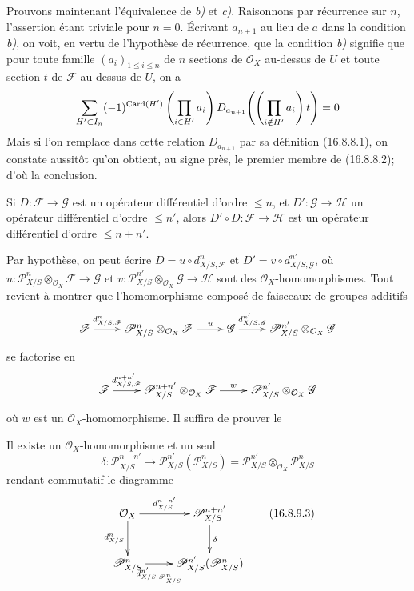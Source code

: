 Prouvons maintenant l'équivalence de \emph{b)} et \emph{c)}. Raisonnons par récurrence sur
$n$, l'assertion étant triviale pour $n=0$. Écrivant $a_{n+1}$ au lieu de $a$
dans la condition \emph{b)}, on voit, en vertu de l'hypothèse de récurrence, que la
condition \emph{b)} signifie que pour toute famille $(a_i)_{1\leq i\leq n}$ de $n$
sections de $\mathcal{O}_X$ au-dessus de $U$ et toute section $t$ de
$\mathscr{F}$ au-dessus de $U$, on a
\[
  \sum_{H'\subset I_n}(- 1)^{\operatorname{Card}(H')}
  \left(\prod_{i\in H'}a_i\right)
  D_{a_{n+1}}\!\left(\left(\prod_{i\notin H'}a_i\right)t\right)=0
\]
Mais si l'on remplace dans cette relation $D_{a_{n+1}}$ par sa définition
(16.8.8.1), on constate aussitôt qu'on obtient, au signe près, le premier
membre de (16.8.8.2); d'où la conclusion.

\begin{proposition}[16.8.9]
\label{IV.16.8.9}
Si $D:\mathscr{F}\to\mathscr{G}$ est un opérateur différentiel d'ordre
$\leq n$, et $D':\mathscr{G}\to\mathscr{H}$ un opérateur différentiel d'ordre
$\leq n'$, alors $D'\circ D:\mathscr{F}\to\mathscr{H}$ est un opérateur
différentiel d'ordre $\leq n+n'$.
\end{proposition}

Par hypothèse, on peut écrire $D=u\circ d_{X/S,\mathscr{F}}^n$ et
$D'=v\circ d_{X/S,\mathscr{G}}^{n'}$, où
$u:\mathscr{P}_{X/S}^n\otimes_{\mathcal{O}_X}\mathscr{F}\to\mathscr{G}$ et
$v:\mathscr{P}_{X/S}^{n'}\otimes_{\mathcal{O}_X}\mathscr{G}\to\mathscr{H}$
sont des $\mathcal{O}_X$-homomorphismes. Tout revient à montrer que
l'homomorphisme composé de faisceaux de groupes additifs
\[
  \xymatrix{
    \mathscr{F}\ar[r]^-{d_{X/S,\mathscr{F}}^n}
      &\mathscr{P}_{X/S}^n\otimes_{\mathcal{O}_X}\mathscr{F}
        \ar[r]^-u
      &\mathscr{G}\ar[r]^-{d_{X/S,\mathscr{G}}^{n'}}
      &\mathscr{P}_{X/S}^{n'}\otimes_{\mathcal{O}_X}\mathscr{G}
  }
\]
se factorise en
\[
  \xymatrix{
    \mathscr{F}\ar[r]^-{d_{X/S,\mathscr{F}}^{n+n'}}
      &\mathscr{P}_{X/S}^{n+n'}\otimes_{\mathcal{O}_X}\mathscr{F}
        \ar[r]^-w
      &\mathscr{P}_{X/S}^{n'}\otimes_{\mathcal{O}_X}\mathscr{G}
  }
\]
où $w$ est un $\mathcal{O}_X$-homomorphisme. Il suffira de prouver le

\begin{lemma}[16.8.9.1]
\label{IV.16.8.9.1}
Il existe un $\mathcal{O}_X$-homomorphisme et un seul
\[
  \delta:\mathscr{P}_{X/S}^{n+n'}
  \longrightarrow
  \mathscr{P}_{X/S}^{n'}(\mathscr{P}_{X/S}^n)
  =\mathscr{P}_{X/S}^{n'}\otimes_{\mathcal{O}_X}\mathscr{P}_{X/S}^n
  \tag{16.8.9.2}
  \label{IV.16.8.9.2}
\]
rendant commutatif le diagramme
\[
  \xymatrix{
    \mathcal{O}_X\ar[r]^-{d_{X/S}^{n+n'}}\ar[d]_-{d_{X/S}^n}
      &\mathscr{P}_{X/S}^{n+n'}\ar[d]^-\delta\\
    \mathscr{P}_{X/S}^n
      \ar[r]_-{d_{X/S,\mathscr{P}_{X/S}^n}^{n'}}
      &\mathscr{P}_{X/S}^{n'}(\mathscr{P}_{X/S}^n)
  }
  \tag{16.8.9.3}
  \label{IV.16.8.9.3}
\]
\end{lemma}

